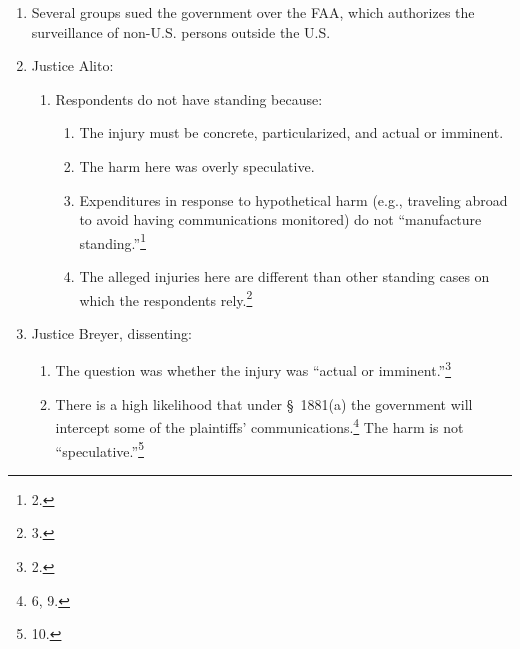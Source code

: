 \begin{enumerate}
    \item Several groups sued the government over the FAA, which authorizes 
    the surveillance of non-U.S. persons outside the U.S.
    \item Justice Alito:
    \begin{enumerate}
        \item Respondents do not have standing because:
        \begin{enumerate}
            \item The injury must be concrete, particularized, and actual or 
            imminent.
            \item The harm here was overly speculative.
            \item Expenditures in response to hypothetical harm (e.g., 
            traveling abroad to avoid having communications monitored) do not 
            ``manufacture standing.''\footnote{2.}
            \item The alleged injuries here are different than other standing 
            cases on which the respondents rely.\footnote{3.}
        \end{enumerate}
    \end{enumerate}
    \item Justice Breyer, dissenting:
    \begin{enumerate}
        \item The question was whether the injury was ``actual or 
        imminent.''\footnote{2.}
        \item There is a high likelihood that under \S\ 1881(a) the government 
        will intercept some of the plaintiffs' communications.\footnote{6, 9.} 
        The harm is not ``speculative.''\footnote{10.}
    \end{enumerate}
\end{enumerate}
